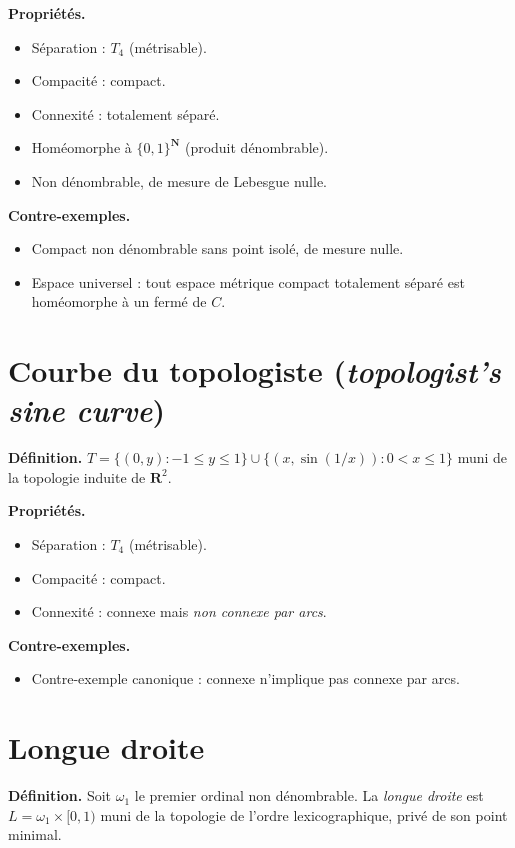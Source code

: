 \documentclass[12pt,a4paper,openany]{book}
\theoremstyle{definition}
\theoremstyle{cours}
\theoremstyle{coursnormal}
\begin{document}
\textbf{Propriétés.}
\begin{itemize}
  \item Séparation : $T_4$ (métrisable).
  \item Compacité : compact.
  \item Connexité : totalement séparé.
  \item Homéomorphe à $\{0,1\}^{\mathbf{N}}$ (produit dénombrable).
  \item Non dénombrable, de mesure de Lebesgue nulle.
\end{itemize}

\textbf{Contre-exemples.}
\begin{itemize}
  \item Compact non dénombrable sans point isolé, de mesure nulle.
  \item Espace universel : tout espace métrique compact totalement
    séparé est homéomorphe à un fermé de $C$.
\end{itemize}

\section{Courbe du topologiste (\textit{topologist's sine curve})}
\label{app:courbe-topologiste}

\textbf{Définition.} $T=\{(0,y):-1\le y\le 1\}\cup
\{(x,\sin(1/x)):0<x\le 1\}$ muni de la topologie induite de
$\mathbf{R}^2$.

\textbf{Propriétés.}
\begin{itemize}
  \item Séparation : $T_4$ (métrisable).
  \item Compacité : compact.
  \item Connexité : connexe mais \emph{non connexe par arcs}.
\end{itemize}

\textbf{Contre-exemples.}
\begin{itemize}
  \item Contre-exemple canonique : connexe n'implique pas connexe par arcs.
\end{itemize}

\section{Longue droite}
\label{app:longue-droite}

\textbf{Définition.} Soit $\omega_1$ le premier ordinal non dénombrable.
La \emph{longue droite} est $L=\omega_1\times[0,1)$ muni de la
topologie de l'ordre lexicographique, privé de son point minimal.
\end{document}
